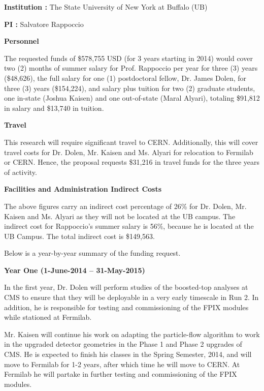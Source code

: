 \documentclass[12pt]{proposalnsf}
\begin{document}
{}


\newpage
{}
\renewcommand{\thepage} {B--\arabic{page}}

\bigskip
{\bf Institution : } The State University of New York at Buffalo (UB)

{\bf PI : } Salvatore Rappoccio


\bigskip
{\bf Personnel}
\bigskip


The requested funds of \$578,755 USD (for 3 years starting in 2014)
would cover two (2) months of summer salary for Prof. Rappoccio per
year for three (3) years
(\$48,626), the full salary for 
one (1) postdoctoral fellow, Dr. James Dolen, for three (3)
years (\$154,224), and salary plus
tuition for two (2) graduate students, one in-state (Joshua
Kaisen) and one out-of-state (Maral Alyari), totaling \$91,812 in
salary and \$13,740 in tuition. 


\bigskip
{\bf Travel}
\bigskip

This research will require significant travel to CERN. Additionally,
this will cover travel costs for Dr. Dolen, Mr. Kaisen and Ms. Alyari
for relocation to Fermilab or CERN. Hence, the proposal requests
\$31,216 in travel funds for the three years of activity. 

\bigskip
{\bf Facilities and Administration Indirect Costs}
\bigskip

The above figures carry an indirect cost
percentage of 26\% for Dr. Dolen, Mr. Kaisen and Ms. Alyari as they
will not be located at the UB campus. The indirect cost
for Rappoccio's summer salary is 56\%, because he is located at the
UB Campus. The total indirect cost is \$149,563.

Below is a year-by-year summary of the funding request. 

\bigskip
\bigskip
{\bf \Large Year One (1-June-2014 -- 31-May-2015)}
\bigskip

In the first year, Dr. Dolen will perform studies of the
boosted-top analyses at CMS to ensure that they will be
deployable in a very early timescale in Run 2. In addition, he is
responsible for testing and commissioning of the FPIX
modules while stationed at Fermilab. 

Mr. Kaisen will continue his work on adapting the particle-flow
algorithm to work in the upgraded detector geometries in the Phase 1
and Phase 2 upgrades of CMS. He is expected to finish his classes in
the Spring Semester, 2014, and will move to Fermilab for 1-2 years,
after which time he will move to CERN. At Fermilab he will partake in
further testing and commissioning of the FPIX modules. 
\end{document}

